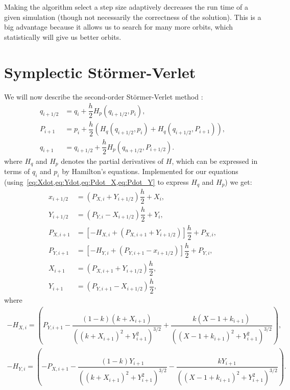 Making the algorithm select a step size adaptively decreases the run time of a given simulation (though not necessarily the correctness of the solution). This is a big advantage because it allows us to search for many more orbits, which statistically will give us better orbits.

\section{Symplectic Störmer-Verlet}
We will now describe the second-order Störmer-Verlet method \cite{Hochbruck2008}:
\begin{align}
q_{i+1/2} &= q_i + \dfrac{h}{2}H_p(q_{i+1/2}, p_i), \\
P_{i+1} &= p_i + \dfrac{h}{2}(H_q(q_{i+1/2}, p_i) + H_q(q_{i+1/2}, P_{i+1})), \\
q_{i+1} &= q_{i+1/2} + \dfrac{h}{2}H_p(q_{n+1/2}, P_{i+1/2}).
\end{align}
where $H_q$ and $H_p$ denotes the partial derivatives of $H$, which can be expressed in terms of $q_i$ and $p_i$ by Hamilton's equations. Implemented for our equations (using~\cref{eq:Xdot,eq:Ydot,eq:Pdot_X,eq:Pdot_Y} to express $H_q$ and $H_p$) we get:
\begin{align}
x_{i+1/2} &= (P_{X,i} + Y_{i+1/2})\dfrac{h}{2} + X_i, \\[0.3cm]
Y_{i+1/2} &= (P_{Y,i} - X_{i+1/2})\dfrac{h}{2} + Y_i, \\[0.8cm]
%
%
P_{X,i+1} &= \left[-H_{X,i} + (P_{X,i+1} + Y_{i+1/2}) \right]\dfrac{h}{2} + P_{X,i}, \\[0.3cm]
%
P_{Y,i+1} &= \left[-H_{Y,i} + (P_{Y,i+1} -x_{i+1/2}) \right]\dfrac{h}{2} + P_{Y,i},\\[0.8cm]
%
%
X_{i+1} &= (P_{X,i+1} + Y_{i+1/2})\dfrac{h}{2}, \\[0.3cm]
Y_{i+1} &= (P_{Y,i+1} - X_{i+1/2})\dfrac{h}{2},
\end{align}
where
\begin{align}
-H_{X,i} = \left(P_{Y,i+1} - \dfrac{(1-k)(k+X_{i+1})}{((k+X_{i+1})^2+Y_{i+1}^2)^{3/2}} + \dfrac{k(X-1+k_{i+1})}{((X-1+k_{i+1})^2+Y_{i+1}^2)^{3/2}}\right), \\[0.5cm]
-H_{Y,i} = \left(-P_{X,i+1} - \dfrac{(1-k)Y_{i+1}}{((k+X_{i+1})^2+Y_{i+1}^2)^{3/2}} - \dfrac{k Y_{i+1}}{((X-1+k_{i+1})^2+Y_{i+1}^2)^{3/2}}\right).
\end{align}


